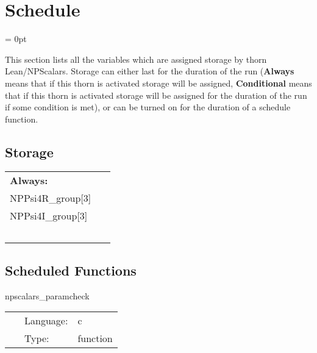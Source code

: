 
\section{Schedule} 


\parskip = 0pt


\noindent This section lists all the variables which are assigned storage by thorn Lean/NPScalars.  Storage can either last for the duration of the run ({\bf Always} means that if this thorn is activated storage will be assigned, {\bf Conditional} means that if this thorn is activated storage will be assigned for the duration of the run if some condition is met), or can be turned on for the duration of a schedule function.


\subsection*{Storage}

\hspace{5mm}

 \begin{tabular*}{160mm}{ll} 

{\bf Always:}&  ~ \\ 
 NPPsi4R\_group[3] & ~\\ 
 NPPsi4I\_group[3] & ~\\ 
~ & ~\\ 
\end{tabular*} 


\subsection*{Scheduled Functions}
\vspace{5mm}


\hspace{5mm} npscalars\_paramcheck 

\hspace{5mm}{\it check npscalars parameters for consistency } 


\hspace{5mm}

 \begin{tabular*}{160mm}{cll} 
~ & Language:  & c \\ 
~ & Type:  & function \\ 
\end{tabular*} 


\vspace{5mm}

